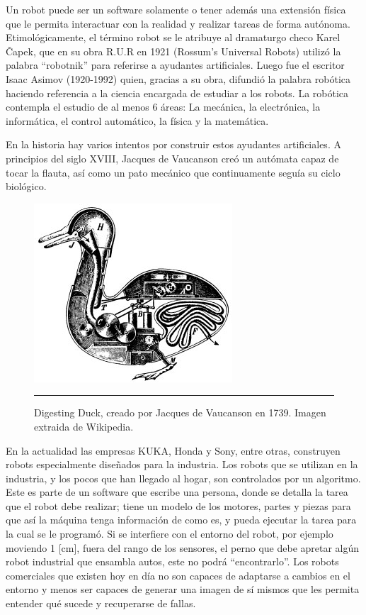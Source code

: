 Un robot puede ser un software solamente o tener además una extensión física que le permita interactuar con la realidad y realizar tareas de forma autónoma. Etimológicamente, el término robot se le atribuye al dramaturgo checo Karel Čapek, que en su obra R.U.R en 1921 (Rossum’s Universal Robots) utilizó la palabra “robotnik” para referirse a ayudantes artificiales. Luego fue el escritor Isaac Asimov (1920-1992) quien,  gracias a su obra, difundió la palabra robótica haciendo referencia a la ciencia encargada de estudiar a los robots. La robótica contempla el estudio de al menos 6 áreas: La mecánica, la electrónica, la informática, el control automático, la física y la matemática.

En la historia hay varios intentos por construir estos ayudantes artificiales. A principios del siglo XVIII, Jacques de Vaucanson creó un autómata capaz de tocar la flauta, así como un pato mecánico que continuamente seguía su ciclo biológico.

\begin{figure}[htbp]
	\centering
		\includegraphics{./Figures/Duck_of_Vaucanson.jpg}
		\rule{35em}{0.5pt}
	\caption[Digesting Duck]{Digesting Duck, creado por Jacques de Vaucanson en 1739. Imagen extraida de Wikipedia.}
	\label{fig:Duck}
\end{figure}

En la actualidad las empresas KUKA, Honda y Sony, entre otras, construyen robots especialmente diseñados para la industria. Los robots que se utilizan en la industria, y los pocos que han llegado al hogar, son controlados por un algoritmo. Este es parte de un software que escribe una persona, donde se detalla la tarea que el robot debe realizar; tiene un modelo de los motores, partes y piezas para que así la máquina tenga información de como es, y pueda ejecutar la tarea para la cual se le programó. Si se interfiere con el entorno del robot, por ejemplo moviendo 1 [cm], fuera del rango de los sensores, el perno que debe apretar algún robot industrial que ensambla autos, este no podrá “encontrarlo”. Los robots comerciales que existen hoy en día no son capaces de adaptarse a cambios en el entorno y menos ser capaces de generar una imagen de sí mismos que les permita entender qué sucede y recuperarse de fallas.

